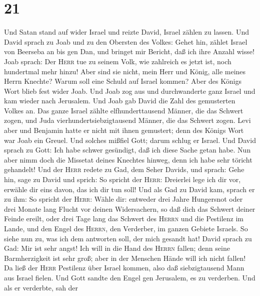 \hypertarget{section-20}{%
\section{21}\label{section-20}}

 Und Satan stand auf wider Israel und reizte David, Israel
zählen zu lassen.  Und David sprach zu Joab und zu den
Obersten des Volkes: Gehet hin, zählet Israel von Beerseba an bis gen
Dan, und bringet mir Bericht, daß ich ihre Anzahl wisse! 
Joab sprach: Der \textsc{Herr} tue zu seinem Volk, wie zahlreich es
jetzt ist, noch hundertmal mehr hinzu! Aber sind sie nicht, mein Herr
und König, alle meines Herrn Knechte? Warum soll eine Schuld auf Israel
kommen?  Aber des Königs Wort blieb fest wider Joab. Und
Joab zog aus und durchwanderte ganz Israel und kam wieder nach
Jerusalem.  Und Joab gab David die Zahl des gemusterten
Volkes an. Das ganze Israel zählte elfhunderttausend Männer, die das
Schwert zogen, und Juda vierhundertsiebzigtausend Männer, die das
Schwert zogen.  Levi aber und Benjamin hatte er nicht mit
ihnen gemustert; denn des Königs Wort war Joab ein Greuel.
 Und solches mißfiel Gott; darum schlug er Israel.
 Und David sprach zu Gott: Ich habe schwer gesündigt, daß
ich diese Sache getan habe. Nun aber nimm doch die Missetat deines
Knechtes hinweg, denn ich habe sehr töricht gehandelt! 
Und der \textsc{Herr} redete zu Gad, dem Seher Davids, und sprach:
 Gehe hin, sage zu David und sprich: So spricht der
\textsc{Herr}: Dreierlei lege ich dir vor, erwähle dir eins davon, das
ich dir tun soll!  Und als Gad zu David kam, sprach er zu
ihm: So spricht der \textsc{Herr}: Wähle dir:  entweder
drei Jahre Hungersnot oder drei Monate lang Flucht vor deinen
Widersachern, so daß dich das Schwert deiner Feinde ereilt, oder drei
Tage lang das Schwert des \textsc{Herrn} und die Pestilenz im Lande, und
den Engel des \textsc{Herrn}, den Verderber, im ganzen Gebiete Israels.
So siehe nun zu, was ich dem antworten soll, der mich gesandt hat!
 David sprach zu Gad: Mir ist sehr angst! Ich will in die
Hand des \textsc{Herrn} fallen; denn seine Barmherzigkeit ist sehr groß;
aber in der Menschen Hände will ich nicht fallen!  Da
ließ der \textsc{Herr} Pestilenz über Israel kommen, also daß
siebzigtausend Mann aus Israel fielen.  Und Gott sandte
den Engel gen Jerusalem, es zu verderben. Und als er verderbte, sah der
